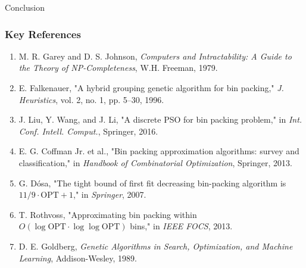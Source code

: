 \documentclass[aspectratio=169,12pt]{beamer}
\begin{document}
\begin{frame}{Conclusion}
\vspace{1cm}
\end{frame}

\begin{frame}
    \frametitle{Key References}
    \footnotesize %
    \begin{enumerate}
        \item M. R. Garey and D. S. Johnson, \emph{Computers and Intractability: A Guide to the Theory of NP-Completeness}, W.H. Freeman, 1979.
        
        \item E. Falkenauer, "A hybrid grouping genetic algorithm for bin packing," \emph{J. Heuristics}, vol. 2, no. 1, pp. 5–30, 1996.
        
        \item J. Liu, Y. Wang, and J. Li, "A discrete PSO for bin packing problem," in \emph{Int. Conf. Intell. Comput.}, Springer, 2016.
        
        \item E. G. Coffman Jr. et al., "Bin packing approximation algorithms: survey and classification," in \emph{Handbook of Combinatorial Optimization}, Springer, 2013.
        
        \item G. Dósa, "The tight bound of first fit decreasing bin-packing algorithm is $11/9\cdot \text{OPT} + 1$," in \emph{Springer}, 2007.
        
        \item T. Rothvoss, "Approximating bin packing within $O(\log \text{OPT} \cdot \log \log \text{OPT})$ bins," in \emph{IEEE FOCS}, 2013.
        
        \item D. E. Goldberg, \emph{Genetic Algorithms in Search, Optimization, and Machine Learning}, Addison-Wesley, 1989.
    \end{enumerate}
\end{frame}
\end{document}
